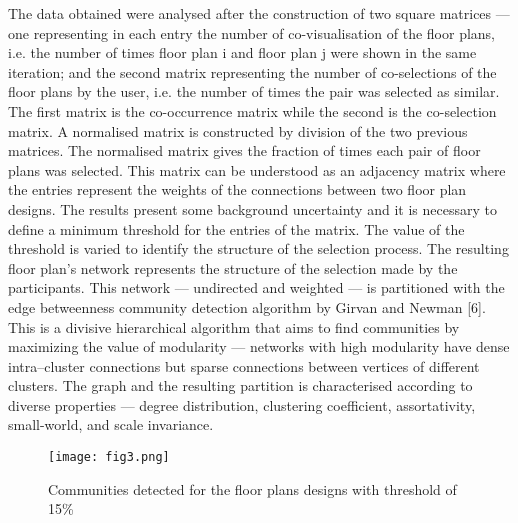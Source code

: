 \documentclass[]{scrartcl}
\begin{document}
The data obtained were analysed after the construction of two square matrices — one representing in each entry the number of co-visualisation of the floor plans, i.e. the number of times floor plan i and floor plan j were shown in the same iteration; and the second matrix representing the number of co-selections of the floor plans by the user, i.e. the number of times the pair was selected as similar. The first matrix is the co-occurrence matrix while the second is the co-selection matrix.
A normalised matrix is constructed by division of the two previous matrices. The normalised matrix gives the fraction of times each pair of floor plans was selected. This matrix can be understood as an adjacency matrix where the entries represent the weights of the connections between two floor plan designs. The results present some background uncertainty and it is necessary to define a minimum threshold for the entries of the matrix. The value of the threshold is varied to identify the structure of the selection process. The resulting floor plan’s network represents the structure of the selection made by the participants. This network — undirected and weighted — is partitioned with the edge betweenness community detection algorithm by Girvan and Newman [6]. This is a divisive hierarchical algorithm that aims to find communities by maximizing the value of modularity — networks with high modularity have dense intra–cluster connections but sparse connections between vertices of different clusters. The graph and the resulting partition is characterised according to diverse properties — degree distribution, clustering coefficient, assortativity, small-world, and scale invariance. 

\begin{figure}[htbp]
\centering
\texttt{[image: fig3.png]}
\caption{Communities detected for the floor plans designs with threshold of 15\%}
\label{fig3}
\end{figure}
\end{document}
